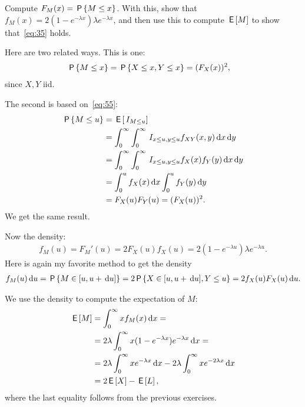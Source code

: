 \documentclass[a4paper,12pt]{article}
\begin{document}
\begin{exercise}\label{ex:6}
Compute $F_M(x) = \P{M\leq x}$. With this, show that  $f_{M}(x)=2(1-e^{-\lambda x}) \lambda e^{-\lambda x}$,  and then use this to compute $\E M$ to show that~\cref{eq:35} holds.
\begin{solution}
Here are two related ways. This is one:
\begin{align}
\P{M\leq x}   &= \P{X \leq x, Y \leq x} = (F_{X}(x))^{2},
\end{align}
since $X, Y$ iid.  

The second is based on~\cref{eq:55}:
\begin{align}
\P{M\leq u}   
&= \E{\1{M\leq u}} \\ 
&=\int_0^{\infty} \int_0^{\infty} \1{x\leq u, y\leq u} f_{XY}(x,y) \d x \d y \\
&= \int_0^{\infty} \int_0^{\infty} \1{x\leq u, y\leq u} f_{X}(x) f_{Y}(y) \d x \d y \\
&= \int_0^{u} f_{X}(x) \d x \int_0^{u}  f_{Y}(y)  \d y \\
&= F_{X}(u) F_Y(u) = (F_X(u))^2.
\end{align}
We get the same result.



Now  the density:
\begin{align}
  \label{eq:26}
  f_M(u) = F_M'(u) = 2 F_X(u) f_X(u) = 2(1-e^{-\lambda u}) \lambda e^{- \lambda u}.
\end{align}
Here is again my favorite method to get the density
\begin{align}
  \label{eq:28}
f_M(u) \d u = \P{M\in [u, u+\d u]}  = 2\P{X\in [u, u+\d u], Y\leq u} = 2 f_X(u) F_X(u)\d u.
\end{align}

 We use the density to  compute the expectation of $M$:
\begin{align}
  \label{eq:27}
\E M 
&= \int_{0}^{\infty} x f_M(x) \d x = \\
&= 2 \lambda \int_{0}^{\infty} x (1-e^{-\lambda x}) e^{-\lambda x} \d x = \\
&= 2 \lambda \int_{0}^{\infty} x e^{-\lambda x} \d x -  2 \lambda \int_{0}^{\infty} x e^{-2 \lambda x} \d x \\
&= 2 \E X - \E L, 
\end{align}
where the last equality follows from the previous exercises. 

\end{solution}
\end{exercise}
\end{document}
